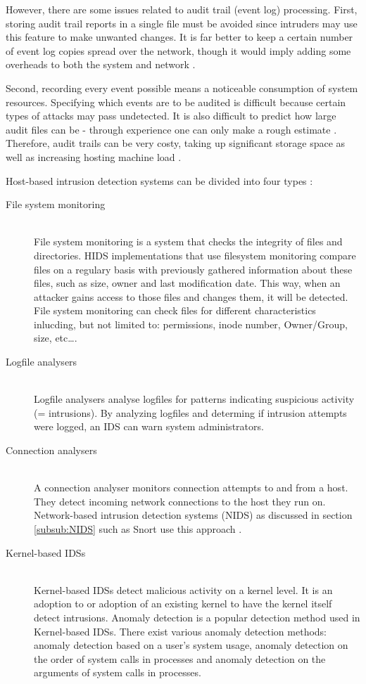 However, there are some issues related to audit trail (event log) processing. First, storing audit trail reports in a single file must be avoided since intruders may use this feature to make unwanted changes. It is far better to keep a certain number of event log copies spread over the network, though it would imply adding some overheads to both the system and network \citep{windowssecurity2}.

Second, recording every event possible means a noticeable consumption of system resources. Specifying which events are to be audited is difficult because certain types of attacks may pass undetected. It is also difficult to predict how large audit files can be - through experience one can only make a rough estimate \citep{windowssecurity2}.
Therefore, audit trails can be very costy, taking up significant storage space as well as increasing hosting machine load \citep{Host1}.

Host-based intrusion detection systems can be divided into four types \citep{Report}:
\begin{description}
\item[File system monitoring] \hfill \\
File system monitoring is a system that checks the integrity of files and directories. HIDS implementations that use filesystem monitoring compare files on a regulary basis with previously gathered information about these files, such as size, owner and last modification date. This way, when an attacker gains access to those files and changes them, it will be detected. File system monitoring can check files for different characteristics inlucding, but not limited to: permissions, inode number, Owner/Group, size, etc\ldots.
\item[Logfile analysers] \hfill \\
Logfile analysers analyse logfiles for patterns indicating suspicious activity (= intrusions). By analyzing logfiles and determing if intrusion attempts were logged, an IDS can warn system administrators.
\item[Connection analysers] \hfill \\
A connection analyser monitors connection attempts to and from a host. They detect incoming network connections to the host they run on. Network-based intrusion detection systems (NIDS) as discussed in section \ref{subsub:NIDS} such as Snort use this approach \citep{Snort}.
\item[Kernel-based IDSs] \hfill \\
Kernel-based IDSs detect malicious activity on a kernel level. It is an adoption to or adoption of an existing kernel to have the kernel itself detect intrusions. Anomaly detection is a popular detection method used in Kernel-based IDSs. There exist various anomaly detection methods: anomaly detection based on a user's system usage, anomaly detection on the order of system calls in processes and anomaly detection on the arguments of system calls in processes.
\end{description}

